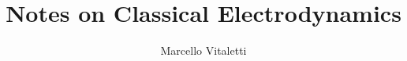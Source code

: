 \documentclass[english, 11pt]{book}
\begin{document}
\newcommand{\quotes}[1]{``#1''}
\newcommand{\sfT}{$\mathsf{T}$}
\newcommand{\udT}{\rotatebox[origin=c]{180}{$\mathsf{T}$}}
\newcommand{\N}{\mathbb{N}}
\newcommand{\Z}{\mathbb{Z}}
\newcommand{\Q}{\mathbb{Q}}
\newcommand{\R}{\mathbb{R}}
\newcommand{\C}{\mathbb{C}}

\DeclareRobustCommand{\rchi}{{\mathpalette\irchi\relax}}
\newcommand{\irchi}[2]{\raisebox{\depth}{$#1\chi$}} %

\author{Marcello Vitaletti}
\title{Notes on Classical Electrodynamics\\
{\small }}
\maketitle

\frontmatter%

%

\tableofcontents
\mainmatter%
	






\end{document}
